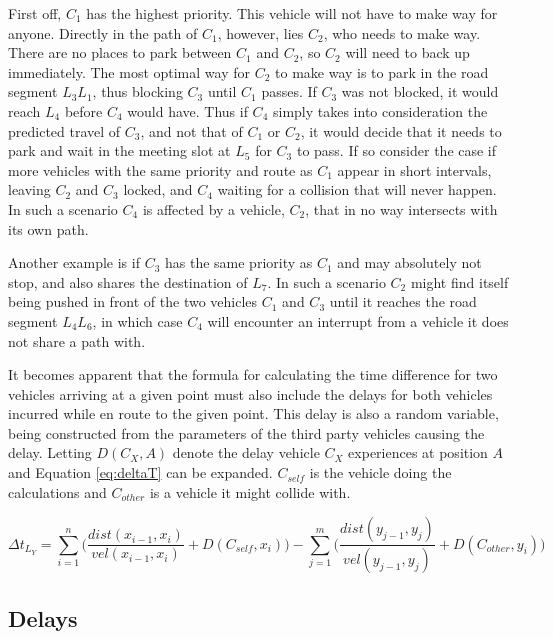 \documentclass{article}
\begin{document}
			First off, $C_1$ has the highest priority. This vehicle will not have to make way for anyone. Directly in the path of $C_1$, however, lies $C_2$, who needs to make way. There are no places to park between $C_1$ and $C_2$, so $C_2$ will need to back up immediately. The most optimal way for $C_2$ to make way is to park in the road segment $L_3L_1$, thus blocking $C_3$ until $C_1$ passes. If $C_3$ was not blocked, it would reach $L_4$ before $C_4$ would have. Thus if $C_4$ simply takes into consideration the predicted travel of $C_3$, and not that of $C_1$ or $C_2$, it would decide that it needs to park and wait in the meeting slot at $L_5$ for $C_3$ to pass. If so consider the case if more vehicles with the same priority and route as $C_1$ appear in short intervals, leaving $C_2$ and $C_3$ locked, and $C_4$ waiting for a collision that will never happen. In such a scenario $C_4$ is affected by a vehicle, $C_2$, that in no way intersects with its own path.

			Another example is if $C_3$ has the same priority as $C_1$ and may absolutely not stop, and also shares the destination of $L_7$. In such a scenario $C_2$ might find itself being pushed in front of the two vehicles $C_1$ and $C_3$ until it reaches the road segment $L_4L_6$, in which case $C_4$ will encounter an interrupt from a vehicle it does not share a path with.

			It becomes apparent that the formula for calculating the time difference for two vehicles arriving at a given point must also include the delays for both vehicles incurred while en route to the given point. This delay is also a random variable, being constructed from the parameters of the third party vehicles causing the delay. Letting $D(C_X, A)$ denote the delay vehicle $C_X$ experiences at position $A$ and Equation \ref{eq:deltaT} can be expanded. $C_{self}$ is the vehicle doing the calculations and $C_{other}$ is a vehicle it might collide with.

			\begin{equation}
				\Delta{t}_{L_Y} = \sum_{i=1}^{n} \bigg(\frac{dist(x_{i-1}, x_i)}{vel(x_{i-1}, x_i)} + D(C_{self}, x_i)\bigg) -\sum_{j=1}^{m} \bigg(\frac{dist(y_{j-1}, y_j)}{vel(y_{j-1}, y_j)} + D(C_{other}, y_i)\bigg)
				\label{eq:deltaTdelay}
			\end{equation}

		\subsection{Delays}
		\label{sec:Delays}
\end{document}
